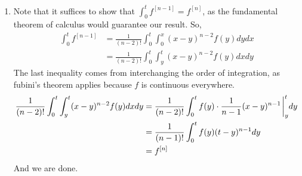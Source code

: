 \documentclass[12pt]{article}
\theoremstyle{definition}
\theoremstyle{remark}
\begin{document}
\begin{enumerate}[leftmargin=\labelsep]
		\item Note that it suffices to show that $\int_{0}^{t} f^{[n-1]} = f^{[n]}$, as the fundamental theorem of calculus would guarantee our result. So,
		\begin{align*}
			\int_{0}^{t} f^{[n-1]} &= \frac{1}{(n-2)!} \int_{0}^{t} \int_{0}^{x} (x-y)^{n-2}f(y)dydx \\
			&= \frac1{(n-2)!} \int_{0}^{t} \int_{y}^{t} (x-y)^{n-2}f(y)dxdy
		\end{align*}
		The last inequality comes from interchanging the order of integration, as fubini's theorem applies because $f$ is continuous everywhere.
		\begin{align*}
			\frac1{(n-2)!} \int_{0}^{t} \int_{y}^{t} (x-y)^{n-2}f(y)dxdy &= \frac1{(n-2)!} \int_{0}^{t} f(y) \cdot \frac1{n-1} (x-y)^{n-1} \eval_y^t dy \\
			&= \frac{1}{(n-1)!} \int_0^t f(y) (t-y)^{n-1} dy \\
			&= f^{[n]}
		\end{align*}
		And we are done.
	\end{enumerate}
\end{document}
